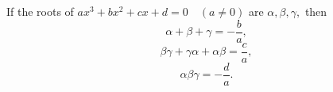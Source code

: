  If the roots of $ ax^3 + bx^2 +cx +d = 0 \quad ( a \neq 0 ) $ are
$ \alpha, \beta, \gamma , $ then 
\[ \alpha + \beta + \gamma = - \frac{b}{a} , \]
\[ \beta \gamma + \gamma \alpha + \alpha \beta = \frac{c}{a} , \]
\[ \alpha \beta \gamma = - \frac{d}{a} . \]
